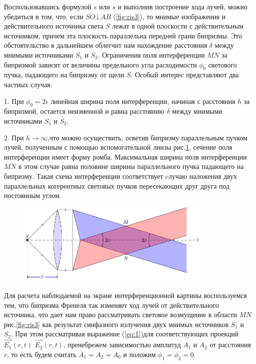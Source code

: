 Воспользовавшись формулой $s$ или $s$ и выполнив построение хода лучей, можно убедиться в том, что, если $SO\bot AB$ (\ref{fig:ris3}), то мнимые изображения и	действительного источника света $S$ лежат в одной плоскости с действительным источником, причем эта плоскость параллельна передней грани бипризмы. Это обстоятельство в дальнейшем облегчит нам нахождение расстояния $\delta$ между мнимыми источниками $S_1$ и	$S_2$.
Ограничения поля интерференции $MN$ за бипризмой зависят от величины предельного угла расходимости $\phi_0$ светового пучка, падающего на бипризму от щели $S$. Особый интерес представляют два частных случая:

1. При $\phi_0 = 2\epsilon$	линейная ширина поля интерференции,
начиная с расстояния $h$ за бипризмой, остается неизменной и равна расстоянию $\delta$ между мнимыми источниками $S_1$ и $S_2$.

2. При $h\rightarrow\infty$,что можно осуществить,
осветив бипризму параллельным пучком лучей, полученным с помощью вспомогательной линзы рис.\ref{fig:ris4}, сечение поля интерференции имеет форму ромба. Максимальная ширина поля интерференции $MN$ в этом случае равна половине ширины параллельного пучка падающего на бипризму. Такая схема интерференции соответствует cлучаю наложения двух параллельных когерентных световых пучков
пересекающих друг друга под постоянным углом.
\begin{figure}[H]
	\centering
	\includegraphics[width=0.85\textwidth]{ris/ris4}
	\caption{ }
	\label{fig:ris4}
\end{figure}
Для расчета наблюдаемой на экране интерференционной картины воспользуемся тем, что бипризма Френеля так изменяет ход лучей от действительного источника, что дает нам право рассматривать световое возмущение в области $MN$ рис.\ref{fig:ris3} как результат синфазного излучения двух мнимых источников $S_1$ и $S_2$. При этом рассматривая выражение (\ref{eq:1})для соответствующих проекций $\vec{E_1}(r,t)$ $\vec{E_2}(r,t)$, пренебрежем зависимостью амплитуд $A_1$ и $A_2$ от расстояния $r$, то есть будем считать $A_1=A_2=A_0$	и положим $\phi_1=\phi_2=0$.

